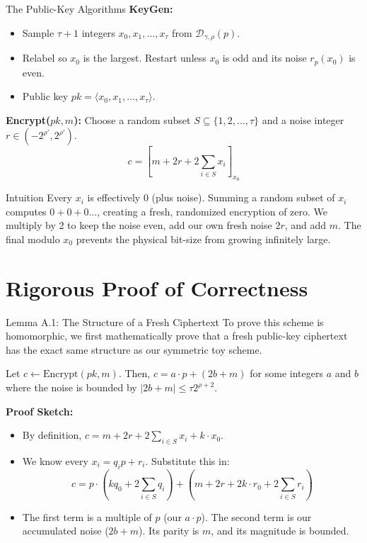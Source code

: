 \documentclass[10pt, aspectratio=169]{beamer}
\begin{document}
\begin{frame}{The Public-Key Algorithms}
    \textbf{KeyGen:}
    \begin{itemize}
        \item Sample $\tau + 1$ integers $x_0, x_1, \dots, x_\tau$ from $\mathcal{D}_{\gamma,\rho}(p)$. 
        \item Relabel so $x_0$ is the largest. Restart unless $x_0$ is odd and its noise $r_p(x_0)$ is even.
        \item Public key $pk = \langle x_0, x_1, \dots, x_\tau \rangle$.
    \end{itemize}
    \pause
    
    \vspace{0.3cm}
    \textbf{Encrypt($pk, m$):}
    Choose a random subset $S \subseteq \{1, 2, \dots, \tau\}$ and a noise integer $r \in (-2^{\rho'}, 2^{\rho'})$.
    $$c = \left[ m + 2r + 2\sum_{i \in S} x_i \right]_{x_0}$$
    \pause
    
    \begin{block}{Intuition}
    Every $x_i$ is effectively $0$ (plus noise). Summing a random subset of $x_i$ computes $0+0+0\dots$, creating a fresh, randomized encryption of zero. We multiply by 2 to keep the noise even, add our own fresh noise $2r$, and add $m$. The final modulo $x_0$ prevents the physical bit-size from growing infinitely large.
    \end{block}
\end{frame}

\section{Rigorous Proof of Correctness}

\begin{frame}{Lemma A.1: The Structure of a Fresh Ciphertext}
    To prove this scheme is homomorphic, we first mathematically prove that a fresh public-key ciphertext has the exact same structure as our symmetric toy scheme.
    \pause
    
    \begin{lemma}[A.1]
    Let $c \leftarrow \text{Encrypt}(pk, m)$. Then, $c = a\cdot p + (2b + m)$ for some integers $a$ and $b$ where the noise is bounded by $|2b+m| \le \tau 2^{\rho+2}$.
    \end{lemma}
    \pause
    
    \vspace{0.3cm}
    \textbf{Proof Sketch:}
    \begin{itemize}
        \item By definition, $c = m + 2r + 2\sum_{i \in S} x_i + k \cdot x_0$.
        \item We know every $x_i = q_i p + r_i$. Substitute this in:
        $$c = p \cdot \left(kq_0 + 2\sum_{i \in S} q_i\right) + \left(m + 2r + 2k \cdot r_0 + 2\sum_{i \in S} r_i\right)$$
        \item The first term is a multiple of $p$ (our $a \cdot p$). The second term is our accumulated noise ($2b+m$). Its parity is $m$, and its magnitude is bounded.
    \end{itemize}
\end{frame}
\end{document}
